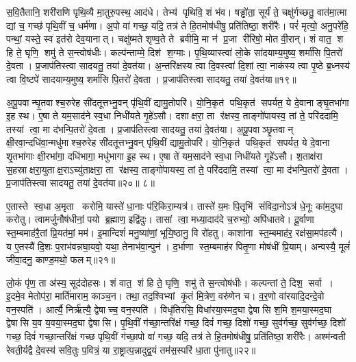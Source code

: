 स॒वि॒तैतानि॒ शरी॑राणि पृथि॒व्यै मा॒तुरु॒पस्थ॒ आद॑धे। तेभ्य॑ पृथिवि॒ शं भ॑व। षड्ढो॑ता॒ सूर्यं॑ ते॒ चक्षु॑र्गच्छतु॒ वात॑मा॒त्मा द्यां च॒ गच्छ॑ पृथि॒वीं च॒ धर्म॑णा। अ॒पो वा॑ गच्छ॒ यदि॒ तत्र॑ ते हि॒तमोष॑धीषु॒ प्रति॑तिष्ठा॒ शरी॑रैः। परं॑ मृत्यो॒ अनु॒परे॑हि॒ पन्थां॒ यस्ते॒ स्व इत॑रो देव॒यानात्। चक्षु॑ष्मते शृण्व॒ते ते ब्रवीमि॒ मा न॑ प्र॒जा री॑रिषो॒ मोत वी॒रान्। शं वात॒ श हि ते॒ घृणि॒ शमु॑ ते स॒न्त्वोष॑धीः। कल्प॑न्ताम्मे॒ दिश॑ श॒ग्माः। पृ॒थि॒व्यास्त्वा॑ लो॒के सा॑दयाम्य॒मुष्य॒ शर्मा॑सि पि॒तरो॑ दे॒वता। प्र॒जाप॑तिस्त्वा सादयतु॒ तया॑ दे॒वत॑या। अ॒न्तरि॑क्षस्य त्वा दि॒वस्त्वा॑ दि॒शां त्वा॒ नाक॑स्य त्वा पृ॒ष्ठे ब्र॒ध्नस्य॑ त्वा वि॒ष्टपे॑ सादयाम्य॒मुष्य॒ शर्मा॑सि पि॒तरो॑ दे॒वता। प्र॒जाप॑तिस्त्वा सादयतु॒ तया॑ दे॒वत॑या॥१९॥

अ॒पू॒पवान्घृ॒तवाश्च॒रुरेह सी॑दतूत्तभ्नु॒वन् पृ॑थि॒वीं द्यामु॒तोपरि॑। यो॒नि॒कृत॑ पथि॒कृत॑ सपर्यत॒ ये दे॒वानाङ्घृ॒तभा॑गा इ॒ह स्थ। ए॒षा ते यम॒साद॑ने स्व॒धा निधी॑यते गृ॒हे॑ऽसौ। दशाक्षरा॒ ता र॑क्षस्व॒ ताङ्गो॑पायस्व॒ तां ते॒ परि॑ददामि॒ तस्यां त्वा॒ मा द॑भन्पि॒तरो॑ दे॒वता। प्र॒जाप॑तिस्त्वा सादयतु॒ तया॑ दे॒वत॑या। अ॒पू॒पवाञ्छृ॒तवान् क्षी॒रवा॒न्दधि॑वा॒न्मधु॑माश्च॒रुरेह सी॑दतूत्तभ्नु॒वन् पृ॑थि॒वीं द्यामु॒तोपरि॑। यो॒नि॒कृत॑ पथि॒कृत॑ सपर्यत॒ ये दे॒वाना शृ॒तभा॑गाः क्षी॒रभा॑गा॒ दधि॑भागा॒ मधु॑भागा इ॒ह स्थ। ए॒षा ते॑ यम॒साद॑ने स्व॒धा निधी॑यते गृ॒हे॑ऽसौ। श॒ताक्ष॑रा स॒हस्राक्षरा॒युताक्ष॒राऽच्यु॑ताक्षरा॒ ता र॑क्षस्व॒ ताङ्गो॑पायस्व॒ तां ते॒ परि॑ददामि॒ तस्यां त्वा॒ मा द॑भन्पि॒तरो॑ दे॒वता। प्र॒जाप॑तिस्त्वा सादयतु॒ तया॑ दे॒वत॑या॥२०॥ ८॥
\anuvakamend[अन॑पस्फुरन्ती॒रुत्त॑र दे॒वत॑या॒ द्वे च॑]

ए॒तास्ते स्व॒धा अ॒मृता करोमि॒ यास्ते॑ धा॒नाः प॑रि॒किरा॒म्यत्र॑। तास्ते॑ य॒मः पि॒तृभि॑ संविदा॒नोऽत्र॑ धे॒नूः का॑म॒दुघा करोतु। त्वामर्जु॒नौष॑धीनां॒ पयो ब्र॒ह्माण॒ इद्वि॑दुः। तासां त्वा॒ मध्या॒दाद॑दे च॒रुभ्यो॒ अपि॑धातवे। दू॒र्वाणा स्त॒म्बमाह॑रै॒तां प्रि॒यत॑मां॒ मम॑। इ॒मान्दिशं॑ मनु॒ष्या॑णां॒ भूयि॒ष्ठानु॒ वि रो॑हतु। काशा॑ना स्त॒म्बमाह॑र॒ रक्ष॑सा॒मप॑हत्यै। य ए॒तस्यै॑ दि॒शः प॒राभ॑वन्नघा॒यवो॒ यथा॒ तेनाभ॑वा॒न्पुन॑। द॒र्भाणा स्त॒म्बमाह॑र पितृ॒णा मोष॑धीं प्रि॒याम्। अन्वस्यै॒ मूलं॑ जीवा॒दनु॒ काण्ड॒मथो॒ फलम्॥२१॥

लो॒कं पृ॑ण॒ ता अ॑स्य॒ सूद॑दोहसः। शं वात॒ शं हि ते॒ घृणि॒ शमु॑ ते स॒न्त्वोष॑धीः। कल्पन्तां ते॒ दिश॒ सर्वा। इ॒दमे॒व मेतोप॑रा॒ मार्ति॑माराम॒ काञ्च॒न। तथा॒ तद॒श्विभ्यां कृ॒तं मि॒त्रेण॒ वरु॑णेन च। व॒र॒णो वा॑रयादि॒दन्दे॒वो वन॒स्पति॑। आर्त्यै॒ निर्\mbox{}ऋ॑त्यै॒ द्वेषाच्च॒ वन॒स्पति॑। विधृ॑तिरसि॒ विधा॑रया॒स्मद॒घा द्वेषासि श॒मि श॒मया॒स्मद॒घा द्वेषासि य॒व य॒वया॒स्मद॒घा द्वेषासि। पृ॒थि॒वीं ग॑च्छा॒न्तरि॑क्षं गच्छ॒ दिवं॑ गच्छ॒ दिशो॑ गच्छ॒ सुव॑र्गच्छ॒ सुव॑र्गच्छ॒ दिशो॑ गच्छ॒ दिवं॑ गच्छा॒न्तरि॑क्षं गच्छ पृथि॒वीं ग॑च्छा॒पो वा॑ गच्छ॒ यदि॒ तत्र॑ ते हि॒तमोष॑धीषु॒ प्रति॑तिष्ठा॒ शरी॑रैः। अश्म॑न्वती रेवती॒र्यद्वै दे॒वस्य॑ सवि॒तुः प॒वित्रं॒ या रा॒ष्ट्रात्प॒न्नादुद्व॒यं तम॑स॒स्परि॑ धा॒ता पु॑नातु॥२२॥
\anuvakamend[फलं॑ पुनातु]

